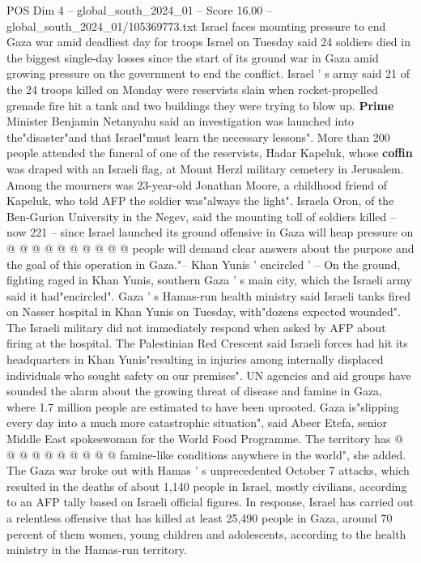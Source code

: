 \begin{textsample}{POS Dim 4 – global\_south\_2024\_01 – Score 16.00 – global\_south\_2024\_01/105369773.txt}  \label{ex:f4_pos_374}
Israel faces mounting pressure to end Gaza war amid deadliest day for troops Israel on Tuesday said 24 soldiers died in the biggest single-day losses since the start of its ground war in Gaza amid growing pressure on the government to end the conflict.
Israel ' s army said 21 of the 24 troops killed on Monday were reservists slain when rocket-propelled grenade fire hit a tank and two buildings they were trying to blow up. \textbf{Prime} Minister Benjamin Netanyahu said an investigation was launched into the"disaster"and that Israel"must learn the necessary lessons".
More than 200 people attended the funeral of one of the reservists, Hadar Kapeluk, whose \textbf{coffin} was draped with an Israeli flag, at Mount Herzl military cemetery in Jerusalem.
Among the mourners was 23-year-old Jonathan Moore, a childhood friend of Kapeluk, who told AFP the soldier was"always the light".
Israela Oron, of the Ben-Gurion University in the Negev, said the mounting toll of soldiers killed -- now 221 -- since Israel launched its ground offensive in Gaza will heap pressure on @ @ @ @ @ @ @ @ @ @ people will demand clear answers about the purpose and the goal of this operation in Gaza."-- Khan Yunis ' encircled ' -- On the ground, fighting raged in Khan Yunis, southern Gaza ' s main city, which the Israeli army said it had"encircled".
Gaza ' s Hamas-run health ministry said Israeli tanks fired on Nasser hospital in Khan Yunis on Tuesday, with"dozens expected wounded".
The Israeli military did not immediately respond when asked by AFP about firing at the hospital.
The Palestinian Red Crescent said Israeli forces had hit its headquarters in Khan Yunis"resulting in injuries among internally displaced individuals who sought safety on our premises".
UN agencies and aid groups have sounded the alarm about the growing threat of disease and famine in Gaza, where 1.7 million people are estimated to have been uprooted.
Gaza is"slipping every day into a much more catastrophic situation", said Abeer Etefa, senior Middle East spokeswoman for the World Food Programme.
The territory has @ @ @ @ @ @ @ @ @ @ famine-like conditions anywhere in the world", she added.
The Gaza war broke out with Hamas ' s unprecedented October 7 attacks, which resulted in the deaths of about 1,140 people in Israel, mostly civilians, according to an AFP tally based on Israeli official figures.
In response, Israel has carried out a relentless offensive that has killed at least 25,490 people in Gaza, around 70 percent of them women, young children and adolescents, according to the health ministry in the Hamas-run territory.

\end{textsample}
